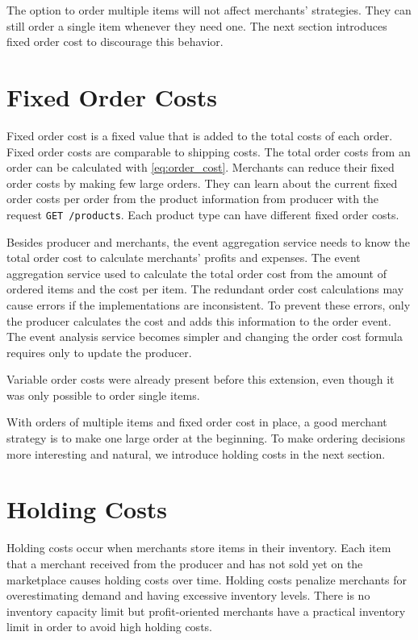 The option to order multiple items will not affect merchants' strategies.
They can still order a single item whenever they need one.
The next section introduces fixed order cost to discourage this behavior.

\section{Fixed Order Costs}
\label{section:fixed_order_cost}
Fixed order cost is a fixed value that is added to the total costs of each order.
Fixed order costs are comparable to shipping costs.
The total order costs from an order can be calculated with \cref{eq:order_cost}.
Merchants can reduce their fixed order costs by making few large orders.
They can learn about the current fixed order costs per order from the product information from producer with the request \texttt{GET /products}.
Each product type can have different fixed order costs.

Besides producer and merchants, the event aggregation service needs to know the total order cost to calculate merchants' profits and expenses.
The event aggregation service used to calculate the total order cost from the amount of ordered items and the cost per item.
The redundant order cost calculations may cause errors if the implementations are inconsistent.
To prevent these errors, only the producer calculates the cost and adds this information to the order event.
The event analysis service becomes simpler and changing the order cost formula requires only to update the producer.

Variable order costs were already present before this extension, even though it was only possible to order single items.

With orders of multiple items and fixed order cost in place, a good merchant strategy is to make one large order at the beginning.
To make ordering decisions more interesting and natural, we introduce holding costs in the next section.

\section{Holding Costs}
\label{section:holding_cost}
Holding costs occur when merchants store items in their inventory.
Each item that a merchant received from the producer and has not sold yet on the marketplace causes holding costs over time.
Holding costs penalize merchants for overestimating demand and having excessive inventory levels.
There is no inventory capacity limit but profit-oriented merchants have a practical inventory limit in order to avoid high holding costs.

